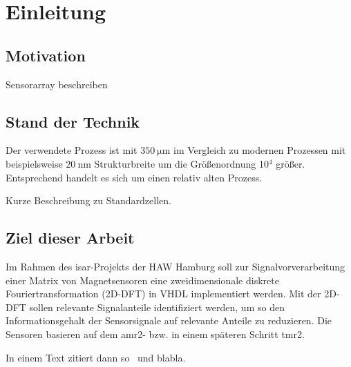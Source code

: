\chapter{Einleitung}
 \section{Motivation}
Sensorarray beschreiben

\section{Stand der Technik}
Der verwendete Prozess ist mit $\SI{350}{\um}$ im Vergleich zu modernen Prozessen mit beispielsweise $\SI{20}{\nm}$ Strukturbreite um die Größenordnung 10$^4$ größer. Entsprechend handelt es 
sich um einen relativ alten Prozess.

Kurze Beschreibung zu Standardzellen.


\section{Ziel dieser Arbeit}
Im Rahmen des \gls{isar}-Projekts der HAW Hamburg soll zur Signalvorverarbeitung einer Matrix von Magnetsensoren  eine 
zweidimensionale diskrete Fouriertransformation (2D-DFT) in VHDL implementiert werden. Mit der 
2D-DFT sollen relevante Signalanteile identifiziert werden, um so den Informationsgehalt der Sensorsignale auf relevante Anteile zu reduzieren. Die Sensoren basieren auf 
dem \gls{amr2}- bzw. in einem späteren Schritt \gls{tmr2}.

In einem Text zitiert dann so~\autocite[10-20]{krey2015systemarchitektur} und blabla.

